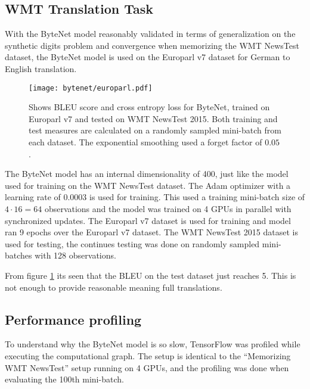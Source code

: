\clearpage
\subsection{WMT Translation Task}

With the ByteNet model reasonably validated in terms of generalization on the synthetic digits problem and convergence when memorizing the WMT NewsTest dataset, the ByteNet model is used on the Europarl v7 dataset for German to English translation.

\begin{figure}[h]
    \centering
    \texttt{[image: bytenet/europarl.pdf]}
    \caption{Shows BLEU score and cross entropy loss for ByteNet, trained on Europarl v7 and tested on WMT NewsTest 2015. Both training and test measures are calculated on a randomly sampled mini-batch from each dataset. The exponential smoothing used a forget factor of $0.05$.}
    \label{fig:result:bytenet:europarl}
\end{figure}

The ByteNet model has an internal dimensionality of 400, just like the model used for training on the WMT NewsTest dataset. The Adam optimizer with a learning rate of 0.0003 is used for training. This used a training mini-batch size of $4 \cdot 16 = 64$ observations and the model was trained on 4 GPUs in parallel with synchronized updates. The Europarl v7 dataset is used for training and model ran 9 epochs over the Europarl v7 dataset. The WMT NewsTest 2015 dataset is used for testing, the continues testing was done on randomly sampled mini-batches with 128 observations.

From figure \ref{fig:result:bytenet:europarl} its seen that the BLEU on the test dataset just reaches 5. This is not enough to provide reasonable meaning full translations.


\clearpage
\subsection{Performance profiling}
To understand why the ByteNet model is so slow, TensorFlow was profiled while executing the computational graph. The setup is identical to the ``Memorizing WMT NewsTest'' setup running on 4 GPUs, and the profiling was done when evaluating the 100th mini-batch.

